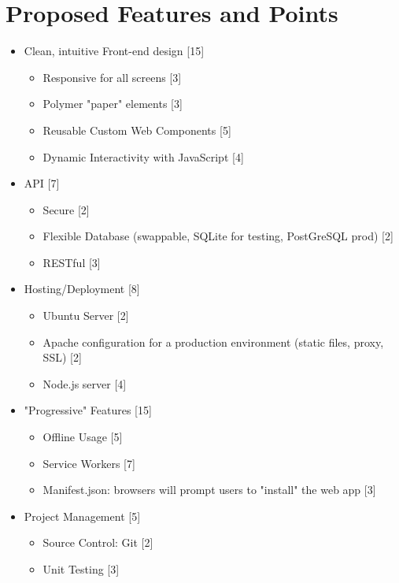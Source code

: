 \documentclass[11pt]{article}
\begin{document}
    \section{Proposed Features and Points}

        \begin{itemize}

            \item Clean, intuitive Front-end design [15]
                \begin{itemize}
                    \item Responsive for all screens [3]
                    \item Polymer "paper" elements [3]
                    \item Reusable Custom Web Components [5]
                    \item Dynamic Interactivity with JavaScript [4]
                \end{itemize}

            \item API [7]
                \begin{itemize}
                    \item Secure [2]
                    \item Flexible Database (swappable, SQLite for testing, PostGreSQL prod) [2]
                    \item RESTful [3]
                \end{itemize}

            \item Hosting/Deployment [8]
                \begin{itemize}
                    \item Ubuntu Server [2]
                    \item Apache configuration for a production environment (static files, proxy, SSL) [2]
                    \item Node.js server [4]
                \end{itemize}

            \item "Progressive" Features [15]
                \begin{itemize}
                    \item Offline Usage [5]
                    \item Service Workers [7]
                    \item Manifest.json: browsers will prompt users to "install" the web app [3]
                \end{itemize}

            \item Project Management [5]
                \begin{itemize}
                    \item Source Control: Git [2]
                    \item Unit Testing [3]
                \end{itemize}

        \end{itemize}
\end{document}
